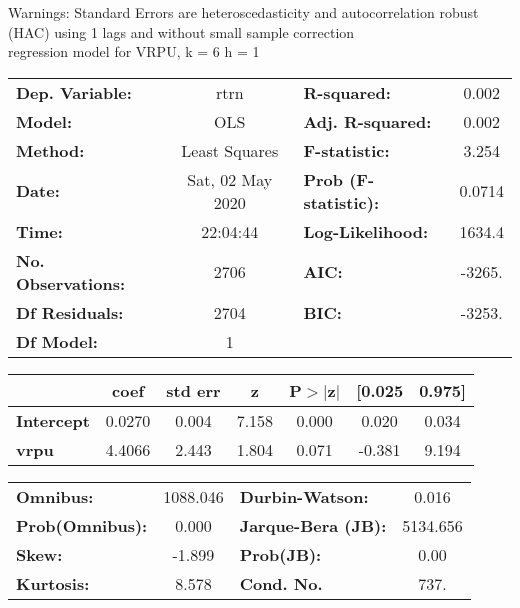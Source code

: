 Warnings: \newline
 [1] Standard Errors are heteroscedasticity and autocorrelation robust (HAC) using 1 lags and without small sample correction\\ 

regression model for VRPU, k = 6 h = 1\begin{center}
\begin{tabular}{lclc}
\toprule
\textbf{Dep. Variable:}    &       rtrn       & \textbf{  R-squared:         } &     0.002   \\
\textbf{Model:}            &       OLS        & \textbf{  Adj. R-squared:    } &     0.002   \\
\textbf{Method:}           &  Least Squares   & \textbf{  F-statistic:       } &     3.254   \\
\textbf{Date:}             & Sat, 02 May 2020 & \textbf{  Prob (F-statistic):} &   0.0714    \\
\textbf{Time:}             &     22:04:44     & \textbf{  Log-Likelihood:    } &    1634.4   \\
\textbf{No. Observations:} &        2706      & \textbf{  AIC:               } &    -3265.   \\
\textbf{Df Residuals:}     &        2704      & \textbf{  BIC:               } &    -3253.   \\
\textbf{Df Model:}         &           1      & \textbf{                     } &             \\
\bottomrule
\end{tabular}
\begin{tabular}{lcccccc}
                   & \textbf{coef} & \textbf{std err} & \textbf{z} & \textbf{P$> |$z$|$} & \textbf{[0.025} & \textbf{0.975]}  \\
\midrule
\textbf{Intercept} &       0.0270  &        0.004     &     7.158  &         0.000        &        0.020    &        0.034     \\
\textbf{vrpu}      &       4.4066  &        2.443     &     1.804  &         0.071        &       -0.381    &        9.194     \\
\bottomrule
\end{tabular}
\begin{tabular}{lclc}
\textbf{Omnibus:}       & 1088.046 & \textbf{  Durbin-Watson:     } &    0.016  \\
\textbf{Prob(Omnibus):} &   0.000  & \textbf{  Jarque-Bera (JB):  } & 5134.656  \\
\textbf{Skew:}          &  -1.899  & \textbf{  Prob(JB):          } &     0.00  \\
\textbf{Kurtosis:}      &   8.578  & \textbf{  Cond. No.          } &     737.  \\
\bottomrule
\end{tabular}
\end{center}

